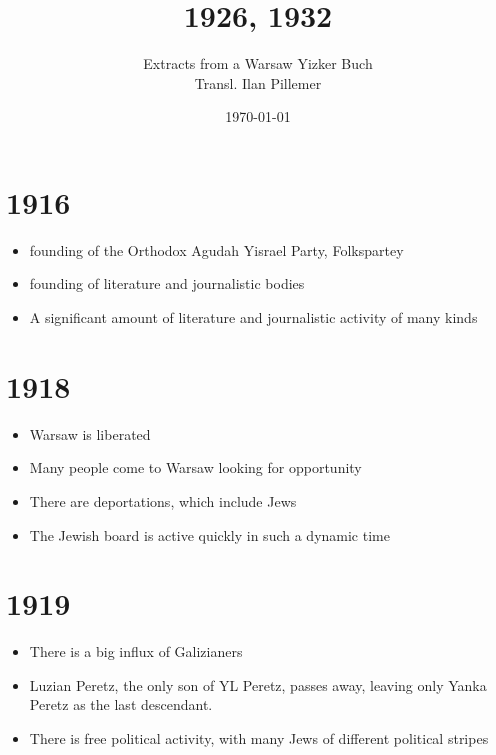 \documentclass{article}
\begin{document}
\renewcommand{\abstractname}{\vspace{-\baselineskip}}
\title{1926, 1932}
\author{Extracts from a Warsaw Yizker Buch \\ Transl. Ilan Pillemer}
\date{\today}

\maketitle

\section{ 1916  }
\begin{itemize}
\item founding of the Orthodox Agudah Yisrael Party, Folkspartey
\item founding of literature and journalistic bodies
\item A significant amount of  literature and journalistic activity of many kinds
\end{itemize}

\section{ 1918 }
\begin{itemize}
\item Warsaw is liberated
\item Many people come to Warsaw looking for opportunity
\item There are deportations, which include Jews
\item The Jewish board is active quickly in such a dynamic time
\end{itemize}
\section{ 1919 }
\begin{itemize}
\item There is a big influx of Galizianers
\item Luzian Peretz, the only son of YL Peretz, passes away, leaving only Yanka Peretz as the last descendant.
\item There is free political activity, with many Jews of different political stripes
\end{itemize}
\end{document}
